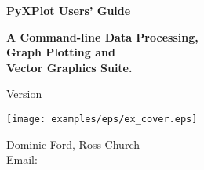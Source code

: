 \documentclass[a4paper,onecolumn,10pt]{book}
\begin{document}
\begin{titlepage}
\normalsize
\vspace*{0.5cm}
\begin{center}
{\Huge \bf PyXPlot Users' Guide}\\
\end{center}
\vspace*{0.5cm}
\begin{center}
{\LARGE \bf A Command-line Data Processing, \\ \vspace{2mm} Graph Plotting and \\ \vspace{2mm} Vector Graphics Suite. \\}
\end{center}
\vspace*{0.5cm}
\begin{center}
{\Large Version \version \\}
\end{center}
\vspace*{0.0cm}
\begin{center}
\texttt{[image: examples/eps/ex\_cover.eps]}
\end{center}
\vspace*{0.0cm}
\begin{center}
{\Large Dominic Ford, Ross Church \\ \vspace{2mm} Email:  \\ }
\end{center}
\vspace*{0.5cm}
\begin{center}
{\Large \reldate \\}
\end{center}
\end{titlepage}


\makeatletter
\renewcommand\l@chapter[2]{%
  \ifnum \c@tocdepth >\m@ne
    \addpenalty{-\@highpenalty}%
    \vskip 1.0em \@plus\p@
    \setlength\@tempdima{2em}%
    \begingroup
      \parindent \z@ \rightskip \@pnumwidth
      \parfillskip -\@pnumwidth
      \leavevmode \bfseries
      \advance\leftskip\@tempdima
      \hskip -\leftskip
      #1\nobreak\hfil \nobreak\hb@xt@\@pnumwidth{\hss #2}\par
      \penalty\@highpenalty
    \endgroup
  \fi}
\renewcommand\l@section{\@dottedtocline{1}{2.0em}{3.0em}}
\renewcommand\l@subsection{\@dottedtocline{2}{5.0em}{4.0em}}
\makeatother
\tableofcontents
\end{document}
